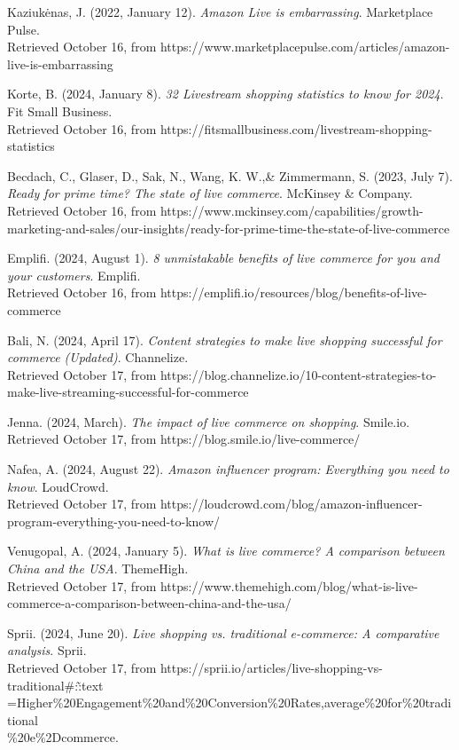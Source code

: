 \documentclass[12pt]{ctexart}
\begin{document}
\begin{thebibliography}{99}
     Kaziukėnas, J. (2022, January 12). \textit{Amazon Live is embarrassing}. Marketplace Pulse.  \\ Retrieved October 16, from https://www.marketplacepulse.com/articles/amazon-live-is-embarrassing

     Korte, B. (2024, January 8). \textit{32 Livestream shopping statistics to know for 2024}. Fit Small Business. \\ Retrieved October 16, from https://fitsmallbusiness.com/livestream-shopping-statistics

     Becdach, C., Glaser, D., Sak, N., Wang, K. W.,\& Zimmermann, S. (2023, July 7). \textit{Ready for prime time? The state of live commerce}. McKinsey \& Company. \\ Retrieved October 16, from https://www.mckinsey.com/capabilities/growth-marketing-and-sales/our-insights/ready-for-prime-time-the-state-of-live-commerce

     Emplifi. (2024, August 1).  \textit{8 unmistakable benefits of live commerce for you and your customers}. Emplifi. \\ Retrieved October 16, from https://emplifi.io/resources/blog/benefits-of-live-commerce

     Bali, N. (2024, April 17). \textit{Content strategies to make live shopping successful for commerce (Updated)}. Channelize. \\ Retrieved October 17, from https://blog.channelize.io/10-content-strategies-to-make-live-streaming-successful-for-commerce

     Jenna. (2024, March). \textit{The impact of live commerce on shopping}. Smile.io. \\ Retrieved October 17, from https://blog.smile.io/live-commerce/

     Nafea, A. (2024, August 22). \textit{Amazon influencer program: Everything you need to know}. LoudCrowd. \\ Retrieved October 17, from https://loudcrowd.com/blog/amazon-influencer-program-everything-you-need-to-know/
    
     Venugopal, A. (2024, January 5). \textit{What is live commerce? A comparison between China and the USA}. ThemeHigh. \\ Retrieved October 17, from https://www.themehigh.com/blog/what-is-live-commerce-a-comparison-between-china-and-the-usa/

     Sprii. (2024, June 20). \textit{Live shopping vs. traditional e-commerce: A comparative analysis}. Sprii. \\ Retrieved October 17, from https://sprii.io/articles/live-shopping-vs-traditional\#:\~:text\\=Higher\%20Engagement\%20and\%20Conversion\%20Rates,average\%20for\%20traditional\\\%20e\%2Dcommerce.


\end{thebibliography}
\end{document}
